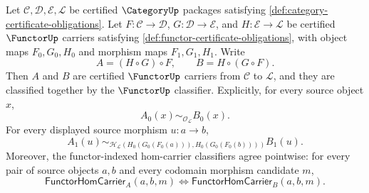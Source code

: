 \begin{theorem}
\label{thm:functor-composition-associativity-classifier-law}
Let $\mathcal C,\mathcal D,\mathcal E,\mathcal L$ be certified
$\CategoryUp$ packages satisfying \autoref{def:category-certificate-obligations}.
Let $F:\mathcal C\to\mathcal D$, $G:\mathcal D\to\mathcal E$, and
$H:\mathcal E\to\mathcal L$ be certified $\FunctorUp$ carriers satisfying
\autoref{def:functor-certificate-obligations}, with object maps
$F_0,G_0,H_0$ and morphism maps $F_1,G_1,H_1$. Write
$$
A=(H\circ G)\circ F,
\qquad
B=H\circ(G\circ F).
$$
Then $A$ and $B$ are certified $\FunctorUp$ carriers from $\mathcal C$ to
$\mathcal L$, and they are classified together by the $\FunctorUp$ classifier.
Explicitly, for every source object $x$,
$$
A_0(x)\sim_{\mathcal O_{\mathcal L}}B_0(x).
$$
For every displayed source morphism $u:a\to b$,
$$
A_1(u)\sim_{\mathcal H_{\mathcal L}(H_0(G_0(F_0(a))),H_0(G_0(F_0(b))))}B_1(u).
$$
Moreover, the functor-indexed hom-carrier classifiers agree pointwise: for
every pair of source objects $a,b$ and every codomain morphism candidate $m$,
$$
\mathsf{FunctorHomCarrier}_{A}(a,b,m)
\Longleftrightarrow
\mathsf{FunctorHomCarrier}_{B}(a,b,m).
$$
\end{theorem}
